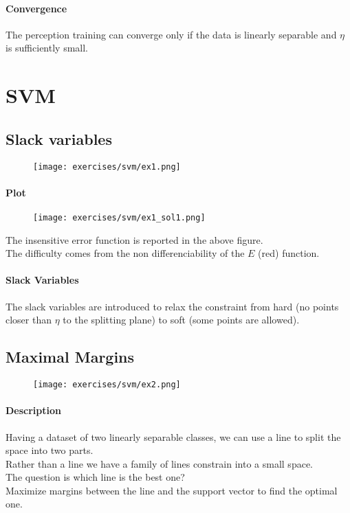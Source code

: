 \paragraph{Convergence}
The perception training can converge only if the data is linearly separable and $\eta$ is sufficiently small.


\section{SVM}


\subsection{Slack variables}

\begin{figure}[H]
    \centering
    \texttt{[image: exercises/svm/ex1.png]}
\end{figure}

\paragraph{Plot}
\begin{figure}[H]
    \centering
    \texttt{[image: exercises/svm/ex1\_sol1.png]}
\end{figure}
The insensitive error function is reported in the above figure.\\
The difficulty comes from the non differenciability of the $E$ (red) function.

\paragraph{Slack Variables}
The slack variables are introduced to relax the constraint from hard (no points closer than $\eta$ to the splitting plane) to soft (some points are allowed).


\subsection{Maximal Margins}

\begin{figure}[H]
    \centering
    \texttt{[image: exercises/svm/ex2.png]}
\end{figure}

\paragraph{Description}
Having a dataset of two linearly separable classes, we can use a line to split the space into two parts.\\
Rather than a line we have a family of lines constrain into a small space.\\
The question is which line is the best one?\\
Maximize margins between the line and the support vector to find the optimal one.

